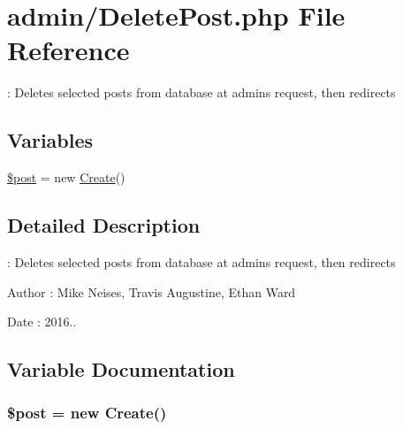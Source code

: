 \hypertarget{_delete_post_8php}{}\section{admin/\+Delete\+Post.php File Reference}
\label{_delete_post_8php}


\+: Deletes selected posts from database at admin\textquotesingle{}s request, then redirects  


\subsection*{Variables}
\begin{DoxyCompactItemize}
\item 
\hyperlink{_delete_post_8php_a53d6c7669d97392c407c4f959a5263db}{\$post} = new \hyperlink{class_create}{Create}()
\end{DoxyCompactItemize}


\subsection{Detailed Description}
\+: Deletes selected posts from database at admin\textquotesingle{}s request, then redirects 

\begin{DoxyAuthor}{Author}
\+: Mike Neises, Travis Augustine, Ethan Ward 
\end{DoxyAuthor}
\begin{DoxyDate}{Date}
\+: 2016.. 
\end{DoxyDate}


\subsection{Variable Documentation}
\subsubsection[{\texorpdfstring{\$post}{$post}}]{\setlength{\rightskip}{0pt plus 5cm}\$post = new {\bf Create}()}\hypertarget{_delete_post_8php_a53d6c7669d97392c407c4f959a5263db}{}\label{_delete_post_8php_a53d6c7669d97392c407c4f959a5263db}
